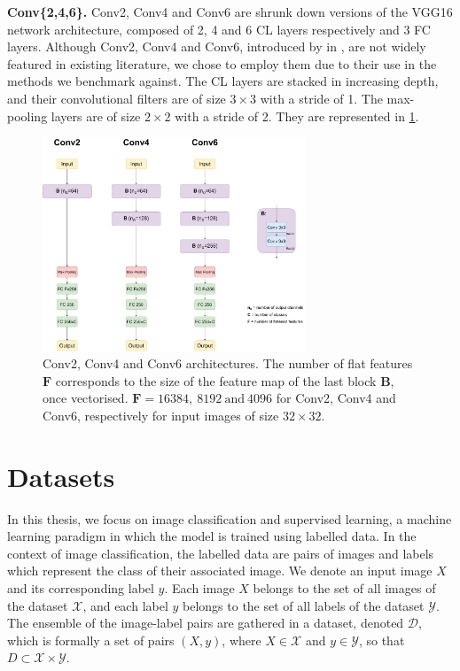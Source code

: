 \noindent \textbf{Conv\{2,4,6\}.} Conv2, Conv4 and Conv6 are shrunk down
versions of the VGG16 network architecture, composed of 2, 4 and 6 \ac{CL}
layers respectively and 3 \ac{FC} layers. Although Conv2, Conv4 and Conv6,
introduced by \citeauthor{DBLP:conf/iclr/FrankleC19} in
\cite{DBLP:conf/iclr/FrankleC19}, are not widely featured in existing
literature, we chose to employ them due to their use in the methods we benchmark
against. The \ac{CL} layers are stacked in increasing depth, and their
convolutional filters are of size $3\times 3$ with a stride of 1. The
max-pooling layers are of size $2\times 2$ with a stride of 2. They are
represented in \cref{fig:dlo:conv246}.\\

\begin{figure}[htbp]
  \centering
  \includegraphics[width=0.7\textwidth]{chapter_dlo/assets/conv246.pdf}
  \caption{Conv2, Conv4 and Conv6 architectures. The number of flat features
  $\mathbf{F}$ corresponds to the size of the feature map of the last block
  $\mathbf{B}$, once vectorised. $\mathbf{F}=16384, ~8192~ \text{and}~ 4096$ for Conv2, Conv4
  and Conv6, respectively for input images of size $32\times 32$.}
  \label{fig:dlo:conv246}
\end{figure}


\section{Datasets}\label{sec:dlo:datasets}

In this thesis, we focus on image classification and supervised learning, a
machine learning paradigm in which the model is trained using labelled data. In
the context of image classification, the labelled data are pairs of images and
labels which represent the class of their associated image. We denote an input
image $X$ and its corresponding label $y$. Each image $X$ belongs to the set of
all images of the dataset $\mathcal{X}$, and each label $y$ belongs to the set
of all labels of the dataset $\mathcal{Y}$. The ensemble of the image-label
pairs are gathered in a dataset, denoted $\mathcal{D}$, which is formally a set
of pairs $(X, y)$, where $X \in \mathcal{X}$ and $y \in \mathcal{Y}$, so that $D
\subset \mathcal{X} \times \mathcal{Y}$. \\

